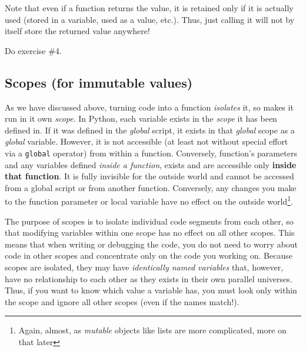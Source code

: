 \documentclass[
]{book}
\begin{document}
Note that even if a function returns the value, it is retained only if it is actually used (stored in a variable, used as a value, etc.). Thus, just calling it will not by itself store the returned value anywhere!

Do exercise \#4.

\hypertarget{scopes-for-immutable-values}{%
\subsection{Scopes (for immutable values)}\label{scopes-for-immutable-values}}

As we have discussed above, turning code into a function \emph{isolates} it, so makes it run in it own \emph{scope}. In Python, each variable exists in the \emph{scope} it has been defined in. If it was defined in the \emph{global} script, it exists in that \emph{global} scope as a \emph{global} variable. However, it is not accessible (at least not without special effort via a \texttt{global} operator) from within a function. Conversely, function's parameters and any variables defined \emph{inside a function}, exists and are accessible only \textbf{inside that function}. It is fully invisible for the outside world and cannot be accessed from a global script or from another function. Conversely, any changes you make to the function parameter or local variable have no effect on the outside world\footnote{Again, almost, as \emph{mutable} objects like lists are more complicated, more on that later}.

The purpose of scopes is to isolate individual code segments from each other, so that modifying variables within one scope has no effect on all other scopes. This means that when writing or debugging the code, you do not need to worry about code in other scopes and concentrate only on the code you working on. Because scopes are isolated, they may have \emph{identically named variables} that, however, have no relationship to each other as they exists in their own parallel universes. Thus, if you want to know which value a variable has, you must look only within the scope and ignore all other scopes (even if the names match!).
\end{document}
